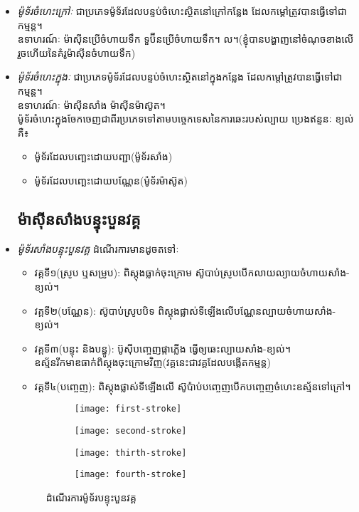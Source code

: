     \begin{itemize}
    	\item \emph{\kml ម៉ូទ័រចំហេះក្រៅៈ} ជាប្រភេទម៉ូទ័រដែលបន្ទប់ចំហេះស្ថិតនៅក្រៅកន្លែង ដែលកម្តៅត្រូវបានធ្វើទៅជា កម្មន្ត។\\
    	ឧទាហរណ៍ៈ ម៉ាសុីនប្រើចំហាយទឹក ទួប៊ីនប្រើចំហាយទឹក។ ល។(ខ្ញុំបានបង្ហាញនៅចំណុចខាងលើរួចហើយនៃគំរូម៉ាសុីនចំហាយទឹក)
    	\item \emph{\kml ម៉ូទ័រចំហេះក្នុងៈ} ជាប្រភេទម៉ូទ័រដែលបន្ទប់ចំហេះស្ថិតនៅក្នុងកន្លែង ដែលកម្តៅត្រូវបានធ្វើទៅជា កម្មន្ត។\\
    	ឧទាហរណ៍ៈ ម៉ាសុីនសាំង ម៉ាសុីនម៉ាស៊ូត។\\
    	ម៉ូទ័រចំហេះក្នុងចែកចេញជាពីរប្រភេទទៅតាមបច្ចេកទេសនៃការឆេះរបស់ល្បាយ ប្រេងឥន្ទនៈ ខ្យល់ គឺ៖
    	\begin{itemize}
    		\item ម៉ូទ័រដែលបញ្ឆេះដោយបញ្ជា(ម៉ូទ័រសាំង)
    		\item ម៉ូទ័រដែលបញ្ឆេះដោយបណ្ណែន(ម៉ូទ័រម៉ាស៊ូត)
    	\end{itemize}
    	\subsection{ម៉ាសុីនសាំងបន្ទុះបួនវគ្គ}
    		\item \emph{\kml ម៉ូទ័រសាំងបន្ទុះបួនវគ្គ} ដំណើរការមានដូចតទៅៈ
    		\begin{itemize}
    			\item វគ្គទី១(ស្រូប ឬសម្រូប): ពិស្តុងធ្លាក់ចុះក្រោម ស៊ូបាប់ស្រូបបើកលាយល្យាយចំហាយសាំង-ខ្យល់។
    			\item វគ្គទី២(បណ្ណែន): ស៊ូបាប់ស្រូបបិទ ពិស្តុងផ្លាស់ទីឡើងលើបណ្ណែនល្បាយចំហាយសាំង-ខ្យល់។
    			\item វគ្គទី៣(បន្ទុះ និងបន្ធូ): ប៊ូសុីបញ្ចេញផ្កាភ្លើង ធ្វើឲ្យឆេះល្បាយសាំង-ខ្យល់។\\ ឧស្ម័នរីកមាឌធាក់ពិស្តុងចុះក្រោមវិញ(វគ្គនេះជាវគ្គដែលបង្កើតកម្មន្ត)
    			\item វគ្គទី៤(បញ្ចេញ): ពិស្តុងផ្លាស់ទីឡើងលើ ស៊ូប៉ាប់បញ្ចេញបើកបញ្ចេញចំហេះឧស្ម័នទៅក្រៅ។
    		\end{itemize}
    		\begin{figure}[H]
    			\centering
    			\begin{subfigure}{.2\textwidth}
    				\texttt{[image: first-stroke]}
    			\end{subfigure}
    			\begin{subfigure}{.2\textwidth}
    				\texttt{[image: second-stroke]}
    			\end{subfigure}
    			\begin{subfigure}{.2\textwidth}
    				\texttt{[image: thirth-stroke]}
    			\end{subfigure}
    			\begin{subfigure}{.2\textwidth}
    				\texttt{[image: fourth-stroke]}
    			\end{subfigure}
    			\caption{ដំណើរការម៉ូទ័របន្ទុះបួនវគ្គ}
    		\end{figure}

\end{itemize}

